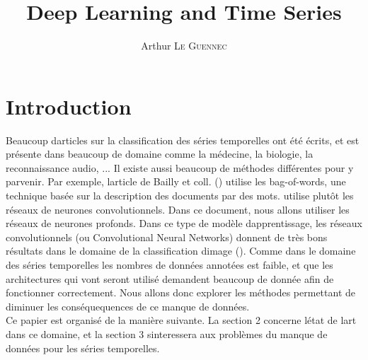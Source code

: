 \documentclass[11pt]{sdm}
\title{Deep Learning and Time Series}
\author{Arthur \textsc{Le Guennec}}
\begin{document}
\maketitle


\section{Introduction}

Beaucoup d\textquotesingle articles sur la classification des s\'eries temporelles ont \'et\'e \'ecrits, et est pr\'esente dans beaucoup de domaine comme la m\'edecine, la biologie, la reconnaissance audio, ... Il existe aussi beaucoup de m\'ethodes diff\'erentes pour y parvenir. Par exemple, l\textquotesingle article de Bailly et coll. (\cite{bailly2015bag}) utilise les bag-of-words, une technique bas\'ee sur la description des documents par des mots. \cite{zheng2014time} utilise plut\^ot les r\'eseaux de neurones convolutionnels.
Dans ce document, nous allons utiliser les r\'eseaux de neurones profonds. Dans ce type de mod\`ele d\textquotesingle apprentissage, les r\'eseaux convolutionnels (ou Convolutional Neural Networks) donnent de tr\`es bons r\'esultats dans le domaine de la classification d\textquotesingle image (\cite{chatfield2014return}).
Comme dans le domaine des s\'eries temporelles les nombres de donn\'ees annot\'ees est faible, et que les architectures qui vont seront utilis\'e demandent beaucoup de donn\'ee afin de fonctionner correctement. Nous allons donc explorer les m\'ethodes permettant de diminuer les cons\'equequences de ce manque de donn\'ees. \\
Ce papier est organis\'e de la mani\`ere suivante. La section 2 concerne l\textquotesingle \'etat de l\textquotesingle art dans ce domaine, et la section 3 s\textquotesingle interessera aux probl\`emes du manque de donn\'ees pour les s\'eries temporelles.
\end{document}
